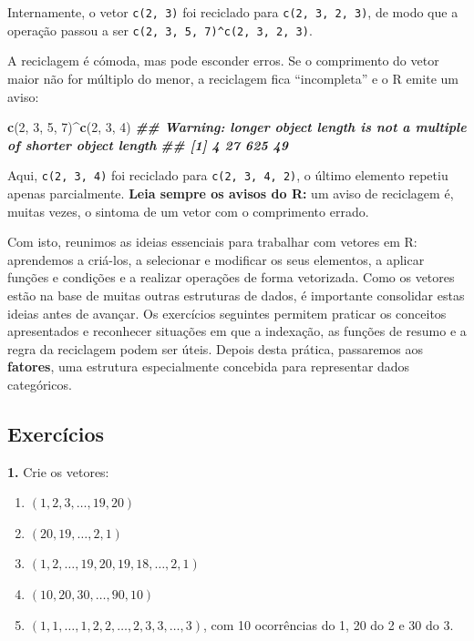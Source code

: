 \documentclass[
  portuguese,
  11pt,
  openany]{book}
\newenvironment{Shaded}{\begin{snugshade}}{\end{snugshade}}
\newcommand{\DecValTok}[1]{\textcolor[rgb]{0.00,0.00,0.81}{#1}}
\newcommand{\DocumentationTok}[1]{\textcolor[rgb]{0.56,0.35,0.01}{\textbf{\textit{#1}}}}
\newcommand{\FunctionTok}[1]{\textcolor[rgb]{0.13,0.29,0.53}{\textbf{#1}}}
\newcommand{\NormalTok}[1]{#1}
\newcommand{\SpecialCharTok}[1]{\textcolor[rgb]{0.81,0.36,0.00}{\textbf{#1}}}
\providecommand{\tightlist}{%
  \setlength{\itemsep}{0pt}\setlength{\parskip}{0pt}}
\begin{document}
Internamente, o vetor \texttt{c(2,\ 3)} foi reciclado para \texttt{c(2,\ 3,\ 2,\ 3)}, de modo que a
operação passou a ser \texttt{c(2,\ 3,\ 5,\ 7)\^{}c(2,\ 3,\ 2,\ 3)}.

A reciclagem é cómoda, mas pode esconder erros. Se o comprimento do vetor maior
não for múltiplo do menor, a reciclagem fica ``incompleta'' e o R emite um aviso:

\begin{Shaded}
\begin{Highlighting}[]
\FunctionTok{c}\NormalTok{(}\DecValTok{2}\NormalTok{, }\DecValTok{3}\NormalTok{, }\DecValTok{5}\NormalTok{, }\DecValTok{7}\NormalTok{)}\SpecialCharTok{\^{}}\FunctionTok{c}\NormalTok{(}\DecValTok{2}\NormalTok{, }\DecValTok{3}\NormalTok{, }\DecValTok{4}\NormalTok{)}
\DocumentationTok{\#\# Warning: longer object length is not a multiple of shorter object length}
\DocumentationTok{\#\# [1]   4  27 625  49}
\end{Highlighting}
\end{Shaded}

Aqui, \texttt{c(2,\ 3,\ 4)} foi reciclado para \texttt{c(2,\ 3,\ 4,\ 2)}, o último elemento repetiu
apenas parcialmente. \textbf{Leia sempre os avisos do R:} um aviso de reciclagem é,
muitas vezes, o sintoma de um vetor com o comprimento errado.

Com isto, reunimos as ideias essenciais para trabalhar com vetores em R: aprendemos a criá-los, a selecionar e modificar os seus elementos, a aplicar funções e condições e a realizar operações de forma vetorizada. Como os vetores estão na base de muitas outras estruturas de dados, é importante consolidar estas ideias antes de avançar. Os exercícios seguintes permitem praticar os conceitos apresentados e reconhecer situações em que a indexação, as funções de resumo e a regra da reciclagem podem ser úteis. Depois desta prática, passaremos aos \textbf{fatores}, uma estrutura especialmente concebida para representar dados categóricos.

\subsection{Exercícios}\label{exercuxedcios-1}

\textbf{1.} Crie os vetores:

\begin{enumerate}
\def\labelenumi{(\alph{enumi})}
\tightlist
\item
  \((1, 2, 3, \ldots, 19, 20)\)
\item
  \((20, 19, \ldots, 2, 1)\)
\item
  \((1, 2, \ldots, 19, 20, 19, 18, \ldots, 2, 1)\)
\item
  \((10, 20, 30, \ldots, 90, 10)\)
\item
  \((1, 1, \ldots, 1, 2, 2, \ldots, 2, 3, 3, \ldots, 3)\), com 10 ocorrências do
  1, 20 do 2 e 30 do 3.
\end{enumerate}
\end{document}
